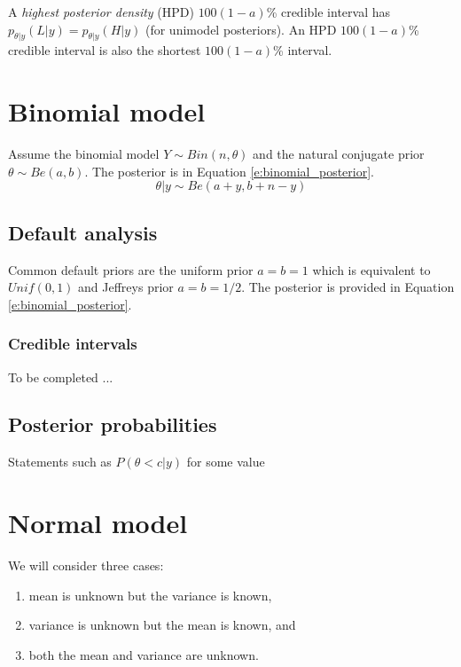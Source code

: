 A \emph{highest posterior density} (HPD) $100(1-a)$\% credible interval has 
$p_{\theta|y}(L|y)=p_{\theta|y}(H|y)$ (for unimodel posteriors).
An HPD $100(1-a)$\% credible interval is also the shortest $100(1-a)$\% interval.


\section{Binomial model}

Assume the binomial model $Y\sim Bin(n,\theta)$ and the natural conjugate 
prior $\theta \sim Be(a,b)$. 
The posterior is in Equation \eqref{e:binomial_posterior}.
\begin{equation}
\theta|y \sim Be(a+y,b+n-y)
\label{e:binomial_posterior}
\end{equation}

\subsection{Default analysis}

Common default priors are the uniform prior $a=b=1$ which is equivalent to 
$Unif(0,1)$ and Jeffreys prior $a=b=1/2$.
The posterior is provided in Equation \eqref{e:binomial_posterior}.

\subsubsection{Credible intervals}
\label{s:binomial_credible_intervals}

To be completed ...

\subsection{Posterior probabilities}

Statements such as $P(\theta<c|y)$ for some value 

\section{Normal model}

We will consider three cases: 
\begin{enumerate}
\item mean is unknown but the variance is known, 
\item variance is unknown but the mean is known, and 
\item both the mean and variance are unknown.
\end{enumerate}


